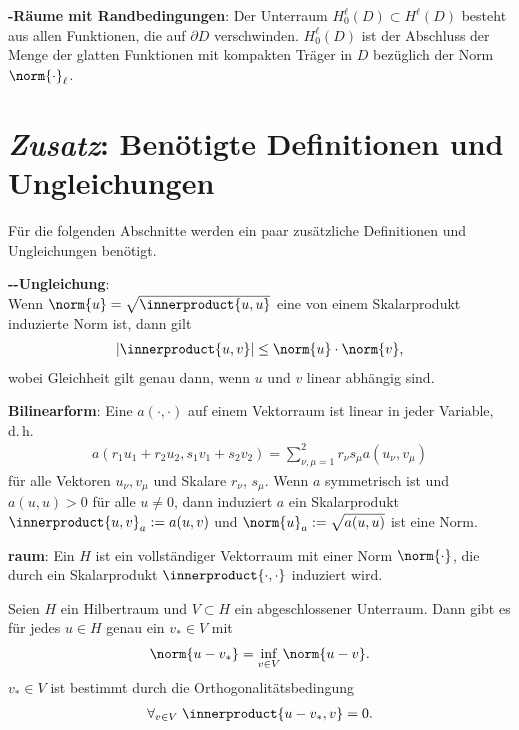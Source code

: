 \linie

\textbf{-Räume mit Randbedingungen}:
Der Unterraum $H_0^\ell(D) \subset H^\ell(D)$ besteht aus allen Funktionen, die auf $\partial D$
verschwinden.
$H_0^\ell(D)$ ist der Abschluss der Menge der glatten Funktionen mit kompakten Träger in $D$
bezüglich der Norm $\norm{\cdot}_\ell$.

\section{%
    \emph{Zusatz}:
    Benötigte Definitionen und Ungleichungen%
}

Für die folgenden Abschnitte werden ein paar zusätzliche Definitionen und Ungleichungen benötigt.

\linie

\textbf{--Ungleichung}:\\
Wenn $\norm{u} = \sqrt{\innerproduct{u, u}}$ eine von einem Skalarprodukt induzierte Norm ist,
dann gilt
\begin{align*}
    |\innerproduct{u, v}| \le \norm{u} \cdot \norm{v},
\end{align*}
wobei Gleichheit gilt genau dann, wenn $u$ und $v$ linear abhängig sind.

\linie

\textbf{Bilinearform}:
Eine  $a(\cdot, \cdot)$ auf einem Vektorraum ist linear in
jeder Variable, d.\,h.
\begin{align*}
    a(r_1 u_1 + r_2 u_2, s_1 v_1 + s_2 v_2) = \sum_{\nu,\mu=1}^2 r_\nu s_\mu a(u_\nu, v_\mu)
\end{align*}
für alle Vektoren $u_\nu, v_\mu$ und Skalare $r_\nu$, $s_\mu$.
Wenn $a$ symmetrisch ist und $a(u, u) > 0$ für alle $u \not= 0$,
dann induziert $a$ ein Skalarprodukt $\innerproduct{u, v}_a := a(u, v)$ und
$\norm{u}_a := \sqrt{a(u, u)}$ ist eine Norm.

\linie

\textbf{raum}:
Ein  $H$ ist ein vollständiger Vektorraum mit einer Norm
$\norm{\cdot}$, die durch ein Skalarprodukt $\innerproduct{\cdot, \cdot}$ induziert wird.

Seien $H$ ein Hilbertraum und $V \subset H$ ein abgeschlossener Unterraum.
Dann gibt es für jedes $u \in H$ genau ein $v_\ast \in V$ mit
\begin{align*}
    \norm{u - v_\ast} = \inf_{v \in V} \norm{u - v}.
\end{align*}
$v_\ast \in V$ ist bestimmt durch die Orthogonalitätsbedingung
\begin{align*}
    \forall_{v \in V}\; \innerproduct{u - v_\ast, v} = 0.
\end{align*}

